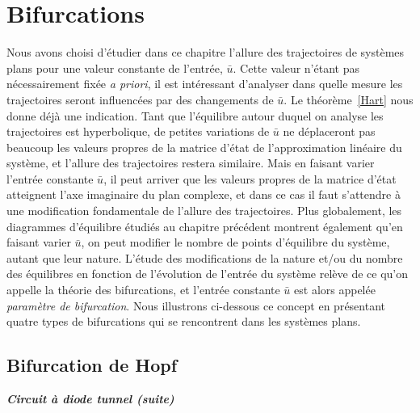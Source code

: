 {%

\section{Bifurcations}

Nous avons choisi d'{é}tudier dans ce chapitre l'allure des trajectoires de syst{è}mes plans pour une valeur constante de l'entr{é}e, $\bar u$. Cette valeur n'{é}tant pas
n{é}cessairement fix{é}e {\em a priori}, il est int{é}ressant d'analyser dans quelle
mesure les trajectoires seront influenc{é}es par des changements de $\bar u$. Le
th{é}or{è}me~\ref{Hart} nous donne d{é}j{à} une indication. Tant que l'{é}quilibre autour
duquel on analyse les trajectoires est hyperbolique, de petites variations de $\bar u$ ne
d{é}placeront pas beaucoup les valeurs propres de la matrice d'{é}tat de l'approximation
lin{é}aire du syst{è}me, et l'allure des trajectoires restera similaire. Mais en faisant
varier l'entr{é}e constante $\bar u$, il peut arriver que les
valeurs propres de la matrice d'{é}tat atteignent l'axe imaginaire du plan complexe, et
dans ce cas il faut s'attendre
{à} une modification fondamentale de l'allure des trajectoires. Plus globalement, les
diagrammes d'{é}quilibre {é}tudi{é}s au chapitre pr{é}c{é}dent montrent {é}galement qu'en
faisant varier $\bar u$, on peut modifier le nombre de points d'{é}quilibre du syst{è}me,
autant que leur nature. L'{é}tude des modifications de la nature et/ou du nombre des
{é}quilibres en fonction de l'{é}volution de l'entr{é}e du syst{è}me
rel{è}ve de ce qu'on appelle la th{é}orie des bifurcations, et l'entr{é}e constante $\bar u$ est alors
appel{é}e {\em param{è}tre de bifurcation}. Nous illustrons ci-dessous ce concept en
pr{é}sentant quatre types de bifurcations qui se rencontrent dans les syst{è}mes plans.

\subsection{Bifurcation de Hopf}

\begin{exemple} {\em\bf Circuit {à} diode tunnel (suite)}


\end{exemple}}
